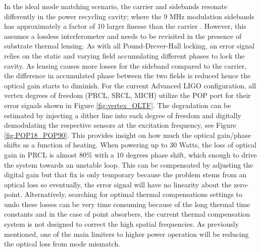 	In the ideal mode matching scenario, the carrier and sidebands resonate differently in the power recycling cavity; where the 9 MHz modulation sidebands has approximately a factor of 10 larger finesse than the carrier \cite{kiwamu_freq1}.  However, this assumes a lossless interferometer and needs to be revisited in the presence of substrate thermal lensing.   As with all Pound-Drever-Hall locking, an error signal relies on the static and varying field accumulating different phases to lock the cavity. As lensing causes more losses for the sideband compared to the carrier, the difference in accumulated phase between the two fields is reduced hence the optical gain starts to diminish.  For the current Advanced LIGO configuration, all vertex degrees of freedom (PRCL, SRCL, MICH) utilize the POP port for their error signals shown in Figure \ref{fig:vertex_OLTF}. The degradation can be estimated by injecting a dither line into each degree of freedom and digitally demodulating the respective sensors at the excitation frequency, see Figure \ref{fig:POP18_POP90}.  This provides insight on how much the optical gain/phase shifts as a function of heating.  When powering up to 30 Watts, the loss of optical gain in PRCL is almost 80\% with a 10 degrees phase shift, which enough to drive the system towards an unstable loop.  This can be compensated by adjusting the digital gain but that fix is only temporary because the problem stems from an optical loss so eventually, the error signal will have no linearity about the zero-point.  Alternatively, searching for optimal thermal compensations settings to undo these losses can be very time consuming because of the long thermal time constants and in the case of point absorbers, the current thermal compensation system is not designed to correct the high spatial frequencies.  As previously mentioned, one of the main limiters to higher power operation will be reducing the optical loss from mode mismatch.

